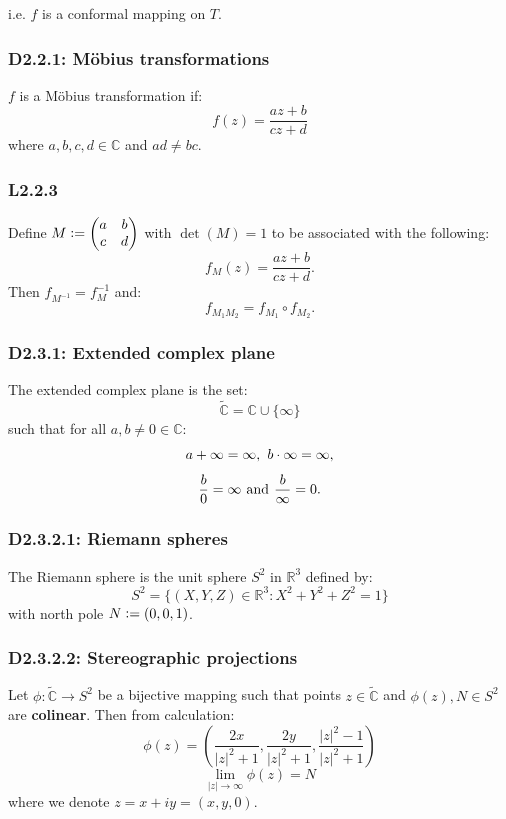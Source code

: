 \documentclass{article}
\newcommand{\deq}{\vcentcolon=}
\begin{document}
\begin{multicols*}{3}
i.e. $f$ is a conformal mapping on $T$.

\subsubsection*{D2.2.1: M\"obius transformations}
$f$ is a M\"obius transformation if:
$$f(z)=\frac{az+b}{cz+d}$$
where $a,b,c,d\in\mathbb{C}$ and $ad\neq bc$.

\subsubsection*{L2.2.3}
Define $\displaystyle M\deq\begin{pmatrix}
a & b \\ c & d\end{pmatrix}$ with $\det(M)=1$
to be associated with the following:
$$f_M(z)=\frac{az+b}{cz+d}.$$
Then $f_{M^{-1}}=f^{-1}_M$ and:
$$f_{M_1 M_2}=f_{M_1}\circ f_{M_2}.$$

\subsubsection*{D2.3.1: Extended complex plane}
The extended complex plane is the set:
$$\widetilde{\mathbb{C}}=\mathbb{C}\cup\{\infty\}$$
such that for all $a,b\neq0\in\mathbb{C}$:
$$a+\infty=\infty,\hspace{0.05in}b\cdot\infty=\infty,$$
$$\frac{b}{0}=\infty\hspace{0.05in}\text{and}
\hspace{0.05in}\frac{b}{\infty}=0.$$

\subsubsection*{D2.3.2.1: Riemann spheres}
The Riemann sphere is the unit sphere $S^2$ in
$\mathbb{R}^3$ defined by:
$$S^2=\{(X,Y,Z)\in\mathbb{R}^3:
X^2+Y^2+Z^2=1\}$$
with north pole $N\deq(0,0,1)$.

\subsubsection*{D2.3.2.2: Stereographic projections}
Let $\phi:\widetilde{\mathbb{C}}\rightarrow S^2$ be a
bijective mapping such that points $z\in\widetilde{\mathbb{C}}$
and $\phi(z),N\in S^2$ are \textbf{colinear}.
Then from calculation:
$$\phi(z)=\left(\frac{2x}{|z|^2+1},
\frac{2y}{|z|^2+1},\frac{|z|^2-1}{|z|^2+1}\right)$$
$$\lim_{|z|\rightarrow\infty}\phi(z)=N$$
where we denote $z=x+iy=(x,y,0)$.


\end{multicols*}
\end{document}
